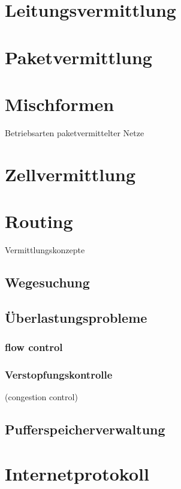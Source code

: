 
\section{Leitungsvermittlung}
\section{Paketvermittlung}
\section{Mischformen}
Betriebsarten paketvermittelter Netze
\section{Zellvermittlung}
\section{Routing}
Vermittlungskonzepte
\subsection{Wegesuchung}
\subsection{Überlastungsprobleme}
\subsubsection{flow control}
\subsubsection{Verstopfungskontrolle}
(congestion control)
\subsection{Pufferspeicherverwaltung}

\section{Internetprotokoll}
